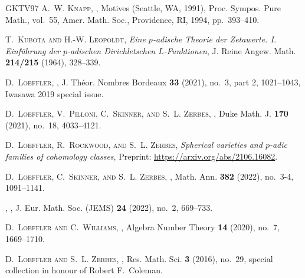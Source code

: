 \documentclass[10pt,reqno,a4paper]{amsart}
\begin{document}
\begin{thebibliography}{GKTV97}
\textsc{A.~W. Knapp},
  , Motives ({S}eattle,
  {WA}, 1991), Proc. Sympos. Pure Math., vol.~55, Amer. Math. Soc., Providence,
  RI, 1994, pp.~393--410. 

\textsc{T.~Kubota and H.-W. Leopoldt}, \emph{Eine {$p$}-adische {T}heorie der
  {Z}etawerte. {I}. {E}inf\"{u}hrung der {$p$}-adischen {D}irichletschen
  {$L$}-{F}unktionen}, J. Reine Angew. Math. \textbf{214/215} (1964), 328--339.

\textsc{D.~Loeffler},
  , J. Th\'{e}or. Nombres
  Bordeaux \textbf{33} (2021), no.~3, part 2, 1021--1043, Iwasawa 2019 special
  issue. 

\textsc{D.~Loeffler, V.~Pilloni, C.~Skinner, and S.~L. Zerbes},
  , Duke Math. J.
  \textbf{170} (2021), no.~18, 4033--4121. 

\textsc{D.~Loeffler, R.~Rockwood, and S.~L. Zerbes}, \emph{Spherical varieties
  and $p$-adic families of cohomology classes}, Preprint:
  \url{https://arxiv.org/abs/2106.16082}.

\textsc{D.~Loeffler, C.~Skinner, and S.~L. Zerbes},
  , Math. Ann. \textbf{382} (2022), no.~3-4,
  1091--1141. 

\bysame, , J. Eur. Math. Soc. (JEMS) \textbf{24} (2022),
  no.~2, 669--733. 

\textsc{D.~Loeffler and C.~Williams},
  , Algebra Number Theory
  \textbf{14} (2020), no.~7, 1669--1710. 

\textsc{D.~Loeffler and S.~L. Zerbes},
  , Res. Math. Sci. \textbf{3} (2016), no.~29,
  special collection in honour of Robert F.\ Coleman.


\end{thebibliography}
\end{document}
